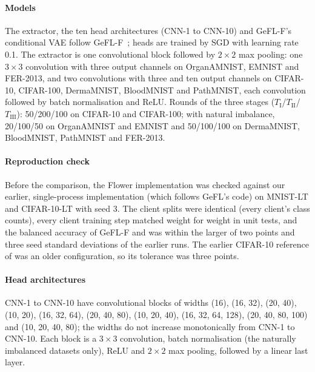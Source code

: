 \paragraph{Models} The extractor, the ten head architectures (CNN-1 to CNN-10) and GeFL-F's conditional VAE follow
GeFL-F~\cite{kang2025gefl}; heads are trained by SGD with learning rate 0.1. The extractor is one convolutional block
followed by $2\times2$ max pooling: one $3\times3$ convolution with three output channels on OrganAMNIST, EMNIST and FER-2013, and two convolutions with three and ten output
channels on CIFAR-10, CIFAR-100, DermaMNIST, BloodMNIST and PathMNIST, each
convolution followed by batch normalisation and ReLU. Rounds of the three stages ($T_{\mathrm{I}}$/$T_{\mathrm{II}}$/$T_{\mathrm{III}}$): 50/200/100 on CIFAR-10 and CIFAR-100; with natural imbalance,
20/100/50 on OrganAMNIST and EMNIST and 50/100/100 on DermaMNIST, BloodMNIST, PathMNIST and FER-2013.

\paragraph{Reproduction check} Before the comparison, the Flower implementation was checked against our earlier,
single-process implementation (which follows GeFL's code) on MNIST-LT and CIFAR-10-LT with seed 3. The client splits
were identical (every client's class counts), every client training step matched weight for weight in unit tests, and
the balanced accuracy of GeFL-F and \ours was within the larger of two points and three seed standard deviations of
the earlier runs. The earlier CIFAR-10 reference of \ours was an older configuration, so its tolerance was three
points.

\paragraph{Head architectures} CNN-1 to CNN-10 have convolutional blocks of widths (16), (16, 32), (20, 40), (10, 20),
(16, 32, 64), (20, 40, 80), (10, 20, 40), (16, 32, 64, 128), (20, 40, 80, 100) and (10, 20, 40, 80); the widths do
not increase monotonically from CNN-1 to CNN-10. Each block is a $3\times3$ convolution, batch normalisation (the
naturally imbalanced datasets only), ReLU and $2\times2$ max pooling, followed by
a linear last layer.

